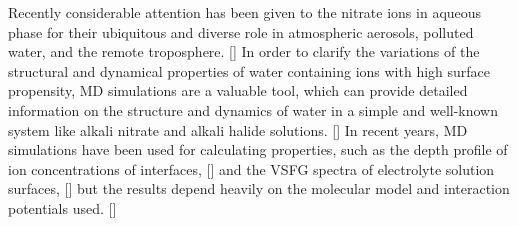Recently considerable attention has been given to the nitrate ions in aqueous phase 
for their ubiquitous and diverse role in atmospheric aerosols, polluted water, 
and the remote troposphere. [\cite{XuM2009,Jubb2012}]
In order to clarify the variations of the structural and dynamical properties 
of water containing ions with high surface propensity, MD simulations are a valuable tool, 
which can provide detailed information on the structure and dynamics  
of water in a simple and well-known system like alkali nitrate and alkali halide solutions. [\cite{KM98}]
%
%
In recent years, MD simulations have been used for calculating properties, 
such as the depth profile of ion concentrations of interfaces, [\cite{PJ01,PJ02}]
and the VSFG spectra of electrolyte solution surfaces, [\cite{Gopalakrishnan2006,Johnson2014,Ishiyama2014,Ishiyama2017}] 
but the results depend heavily on the molecular model and interaction potentials used. [\cite{LXD03,MKP04,TI07,MM05}]
